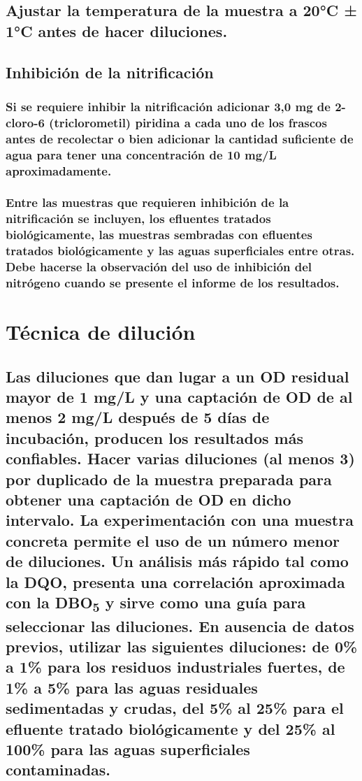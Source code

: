 \documentclass[spanish,12pt,letterpaper,titlepage]{article}
\theoremstyle{definition}
\begin{document}
	\subsection{Ajustar la temperatura de la muestra a 20°C ± 1°C antes de hacer diluciones.}\label{10.6.4}
	\subsection{Inhibición de la nitrificación}\label{10.6.5}
	\subsubsection{Si se requiere inhibir la nitrificación adicionar 3,0 mg de 2-cloro-6 (triclorometil) piridina a cada uno de los frascos antes de recolectar o bien adicionar la cantidad suficiente de agua para tener una concentración de 10 mg/L aproximadamente.}\label{10.6.5.1}
	\subsubsection{Entre las muestras que requieren inhibición de la nitrificación se incluyen, los efluentes tratados biológicamente, las muestras sembradas con efluentes tratados biológicamente y las aguas superficiales entre otras. Debe hacerse la observación del uso de inhibición del nitrógeno cuando se presente el informe de los resultados.}\label{10.6.5.2}
	\section{Técnica de dilución}\label{10.7}
	\subsection{Las diluciones que dan lugar a un OD residual mayor de 1 mg/L y una captación de OD de al menos 2 mg/L después de 5 días de incubación, producen los resultados más confiables. Hacer varias diluciones (al menos 3) por duplicado de la muestra preparada para obtener una captación de OD en dicho intervalo. La experimentación con una muestra concreta permite el uso de un número menor de diluciones. Un análisis más rápido tal como la DQO, presenta una correlación aproximada con la DBO\textsubscript{5} y sirve como una guía para seleccionar las diluciones. En ausencia de datos previos, utilizar las siguientes diluciones: de 0\% a 1\% para los residuos industriales fuertes, de 1\% a 5\% para las aguas residuales sedimentadas y crudas, del 5\% al 25\% para el efluente tratado biológicamente y del 25\% al 100\% para las aguas superficiales contaminadas.}\label{10.7.1}
\end{document}
